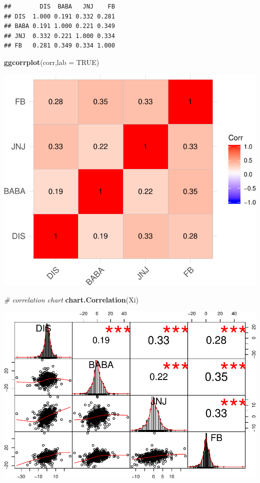 \documentclass[]{article}
\newenvironment{Shaded}{\begin{snugshade}}{\end{snugshade}}
\newcommand{\KeywordTok}[1]{\textcolor[rgb]{0.13,0.29,0.53}{\textbf{#1}}}
\newcommand{\DataTypeTok}[1]{\textcolor[rgb]{0.13,0.29,0.53}{#1}}
\newcommand{\CommentTok}[1]{\textcolor[rgb]{0.56,0.35,0.01}{\textit{#1}}}
\newcommand{\OtherTok}[1]{\textcolor[rgb]{0.56,0.35,0.01}{#1}}
\newcommand{\NormalTok}[1]{#1}
\begin{document}
\begin{verbatim}
##        DIS  BABA   JNJ    FB
## DIS  1.000 0.191 0.332 0.281
## BABA 0.191 1.000 0.221 0.349
## JNJ  0.332 0.221 1.000 0.334
## FB   0.281 0.349 0.334 1.000
\end{verbatim}

\begin{Shaded}
\begin{Highlighting}[]
\KeywordTok{ggcorrplot}\NormalTok{(corr,}\DataTypeTok{lab =} \OtherTok{TRUE}\NormalTok{)}
\end{Highlighting}
\end{Shaded}

\includegraphics{Markowitz_Research_Me_files/figure-latex/unnamed-chunk-11-1.pdf}

\begin{Shaded}
\begin{Highlighting}[]
\CommentTok{# correlation chart}
\KeywordTok{chart.Correlation}\NormalTok{(Xi)}
\end{Highlighting}
\end{Shaded}

\includegraphics{Markowitz_Research_Me_files/figure-latex/unnamed-chunk-11-2.pdf}
\end{document}
